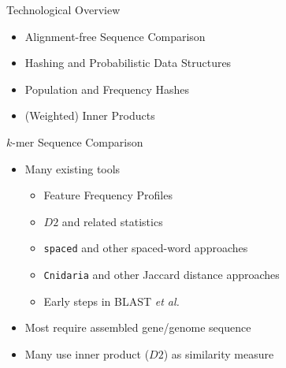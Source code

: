 \documentclass[t]{beamer}
\begin{document}
\begin{frame}{Technological Overview}
  \begin{itemize}
    \item Alignment-free Sequence Comparison
    \item Hashing and Probabilistic Data Structures
    \item Population and Frequency Hashes
    \item (Weighted) Inner Products
  \end{itemize}
\end{frame}


\begin{frame}{$k$-mer Sequence Comparison}
  \begin{itemize}
    \item Many existing tools
    \begin{itemize}
      \item Feature Frequency Profiles \autocite{sims_alignment-free_2009}
      \item $D2$ and related statistics
      \item \texttt{spaced} and other spaced-word approaches
        \autocite{morgenstern_estimating_2015,leimeister_fast_2014}
      \item \texttt{Cnidaria} and other Jaccard distance approaches
        \autocite{aflitos_cnidaria:_2015}
      \item Early steps in BLAST \textit{et al.}
    \end{itemize}
    \item Most require assembled gene/genome sequence
    \item Many use inner product ($D2$) as similarity measure
  \end{itemize}
\end{frame}
\end{document}
